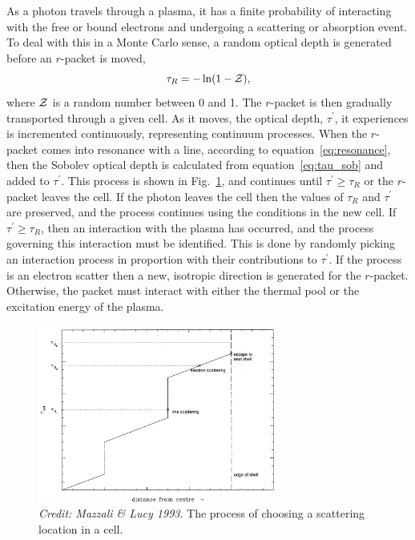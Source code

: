 As a photon travels through a plasma, it has a finite probability
of interacting with the free or bound electrons and undergoing a scattering
or absorption event. To deal with this in a Monte Carlo sense, a random optical 
depth is generated before an $r$-packet is moved,
\begin{equation}
\tau_R = - \ln (1 - {\cal Z}),
\end{equation}
where ${\cal Z}$ is a random number between 0 and 1. 
The $r$-packet is then gradually transported through a given cell. 
As it moves, the optical depth, $\tau^\prime$, it experiences
is incremented continuously, representing continuum processes. When the $r$-packet comes
into resonance with a line, according to equation~\ref{eq:resonance}, then
the Sobolev optical depth is calculated from equation~\ref{eq:tau_sob} and added to 
$\tau^\prime$. This process is shown in Fig.~\ref{fig:scatter_ml93}, and
continues until $\tau^\prime \geq \tau_R$ or the $r$-packet leaves the cell. If the
photon leaves the cell then the values of $\tau_R$ and $\tau^\prime$ are preserved,
and the process continues using the conditions in the new cell. If 
$\tau^\prime \geq \tau_R$, then an interaction with the plasma has occurred, and
the process governing this interaction must be identified. This is done by
randomly picking an interaction process in proportion with their contributions
to $\tau^\prime$. If the process is an electron scatter then a new, isotropic
direction is generated for the $r$-packet. Otherwise, the packet must
interact with either the thermal pool or the excitation energy of the plasma.

\begin{figure}
\centering
\includegraphics[width=0.7\textwidth]{figures/03-radtrans/tau_scat.png}
\caption
{
{\sl Credit: Mazzali \& Lucy 1993}. 
The process of choosing a scattering location in a cell.
} 
\label{fig:scatter_ml93}
\end{figure}


